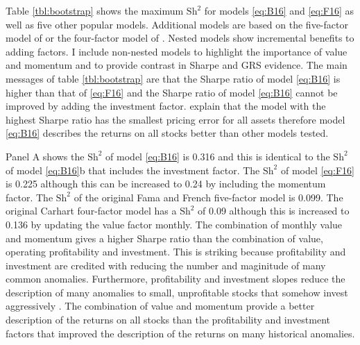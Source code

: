 

Table \ref{tbl:bootstrap} shows the maximum $\text{Sh}^2$ for models
\ref{eq:B16} and \ref{eq:F16} as well as five other popular models. Additional
models are based on the five-factor model of \textcite{fama2015five} or the
four-factor model of \textcite{carhart1997persistence}. Nested models show
incremental benefits to adding factors. I include non-nested models to
highlight the importance of value and momentum and to provide contrast in
Sharpe and GRS evidence.
The main messages of table \ref{tbl:bootstrap} are that the
Sharpe ratio of model \ref{eq:B16} is higher than that of \ref{eq:F16} and the
Sharpe ratio of model \ref{eq:B16} cannot be improved by adding the investment
factor. \textcite{barillas2016alpha} explain that the model with the highest
Sharpe ratio has the smallest pricing error for all assets therefore model
\ref{eq:B16} describes the returns on all stocks better than other models
tested.

Panel A shows the $\text{Sh}^2$ of model \ref{eq:B16} is 0.316 and this
is identical to the $\text{Sh}^2$ of model \ref{eq:B16}b that includes
the investment factor. The $\text{Sh}^2$ of model \ref{eq:F16} is 0.225
although this can be increased to 0.24 by including the momentum factor. The
$\text{Sh}^2$ of the original Fama and French five-factor model is 0.099. The
original Carhart four-factor model has a $\text{Sh}^2$ of 0.09 although this is
increased to 0.136 by updating the value factor monthly. The combination of
monthly value and momentum gives a higher Sharpe ratio than the combination of
value, operating profitability and investment. This is striking because
profitability and investment are credited with reducing the number and
maginitude of many common anomalies. Furthermore, profitability and investment
slopes reduce the description of many anomalies to small, unprofitable stocks
that somehow invest aggressively \parencite{fama2015five, fama2016dissecting}.
The combination of value and momentum provide a better description of the
returns on all stocks than the profitability and investment factors that
improved the description of the returns on many historical anomalies.

